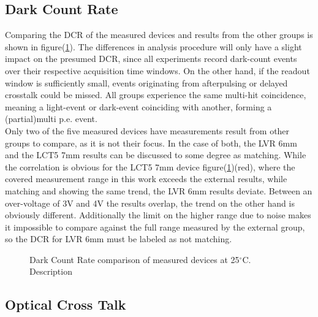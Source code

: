 \documentclass[12pt,article,type=msc,colorback,accentcolor=tud9c]{tudthesis}
\begin{document}
\subsection{Dark Count Rate}
\label{subsec:DC_DCR}

Comparing the DCR of the measured devices and results from the other groups is shown in figure(\ref{fig:DC_DCR}). The differences in analysis procedure will only have a slight impact on the presumed DCR, since all experiments record dark-count events over their respective acquisition time windows. On the other hand, if the readout window is sufficiently small, events originating from afterpulsing or delayed crosstalk could be missed. All groups experience the same multi-hit coincidence, meaning a light-event or dark-event coinciding with another, forming a (partial)multi p.e. event.\\
Only two of the five measured devices have measurements result from other groups to compare, as it is not their focus. In the case of both, the LVR 6mm and the LCT5 7mm results can be discussed to some degree as matching. While the correlation is obvious for the LCT5 7mm device figure(\ref{fig:DC_DCR})(red), where the covered measurement range in this work exceeds the  external results, while matching and showing the same trend, the LVR 6mm results deviate. Between an over-voltage of 3V and 4V the results overlap, the trend on the other hand is obviously different. Additionally the limit on the higher range due to noise makes it impossible to compare against the full range measured by the external group, so the DCR for LVR 6mm must be labeled as not matching. 

\begin{figure}%
\begin{centering}
\caption[DCR device comparison]{Dark Count Rate comparison of measured devices at 25$^\circ$C. Description}
\label{fig:DC_DCR}
\end{centering}
\end{figure}

\subsection{Optical Cross Talk}
\label{subsec:DC_OCT}
\end{document}
